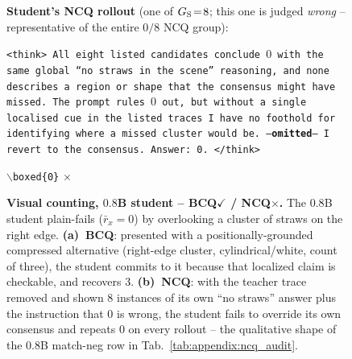 \begin{figure}[!p]
\begin{negcandidatebox}
\textbf{Student's NCQ rollout} (one of $G_{\rm S}\!=\!8$; this one is judged \emph{wrong} -- representative of the entire $0/8$ NCQ group):

\smallskip
\texttt{<think> All eight listed candidates conclude $0$ with the same global ``no straws in the scene'' reasoning, and none describes a region or shape that the consensus might have missed. The prompt rules $0$ out, but without a single localised cue in the listed traces I have no foothold for identifying where a missed cluster would be. ---\textbf{omitted}--- I revert to the consensus. Answer: 0. </think>}

\smallskip
\texttt{$\backslash$boxed\{0\}} \quad \textcolor{neggain}{\ensuremath{\boldsymbol{\times}}}
\end{negcandidatebox}

\caption{\textbf{Visual counting, $0.8$B student -- BCQ$\boldsymbol{\checkmark}$ / NCQ$\boldsymbol{\times}$.} The $0.8$B student plain-fails ($\bar{r}_x\!=\!0$) by overlooking a cluster of straws on the right edge. \textbf{(a)~BCQ}: presented with a positionally-grounded compressed alternative (right-edge cluster, cylindrical/white, count of three), the student commits to it because that localized claim is checkable, and recovers $3$. \textbf{(b)~NCQ}: with the teacher trace removed and shown $8$ instances of its own ``no straws'' answer plus the instruction that $0$ is wrong, the student fails to override its own consensus and repeats $\boxed{0}$ on every rollout -- the qualitative shape of the $0.8$B match-neg row in Tab.~\ref{tab:appendix:ncq_audit}.}
\label{fig:appendix:bcq_ncq_straws}
\end{figure}
